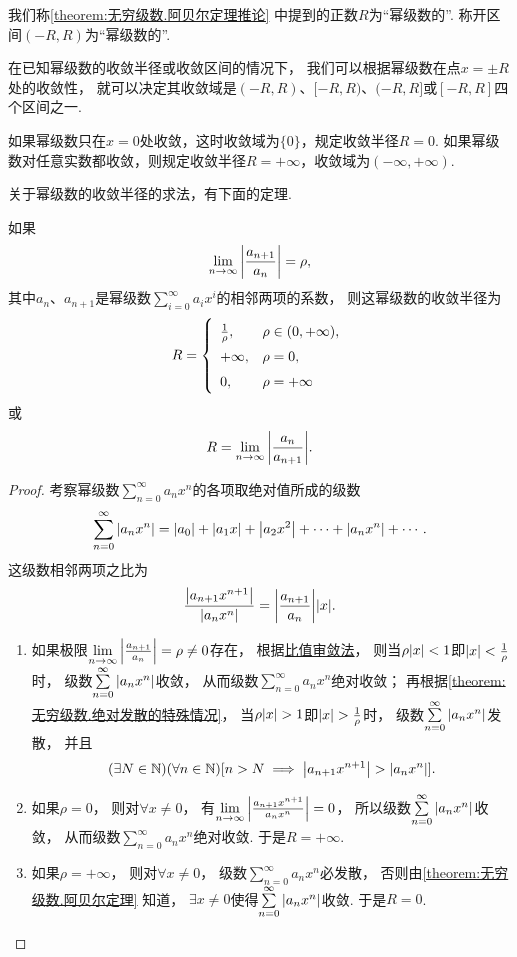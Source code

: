 我们称\cref{theorem:无穷级数.阿贝尔定理推论} 中提到的正数\(R\)为“幂级数的”.
称开区间\((-R,R)\)为“幂级数的”.

在已知幂级数的收敛半径或收敛区间的情况下，
我们可以根据幂级数在点\(x = \pm R\)处的收敛性，
就可以决定其收敛域是\((-R,R)\)、\([-R,R)\)、\((-R,R]\)或\([-R,R]\)四个区间之一.

如果幂级数只在\(x=0\)处收敛，这时收敛域为\(\{0\}\)，规定收敛半径\(R=0\).
如果幂级数对任意实数都收敛，则规定收敛半径\(R=+\infty\)，收敛域为\((-\infty,+\infty)\).

关于幂级数的收敛半径的求法，有下面的定理.
\begin{theorem}\label{theorem:无穷级数.幂级数的收敛半径的求法}
如果\[
\lim\limits_{n\to\infty} \abs{\frac{a_{n+1}}{a_n}} = \rho,
\]其中\(a_n\)、\(a_{n+1}\)是幂级数\(\sum\limits_{i=0}^\infty {a_i x^i}\)的相邻两项的系数，
则这幂级数的收敛半径为\[
\def\arraystretch{1.5}
R = \left\{ \begin{array}{ll}
\frac{1}{\rho}, & \rho \in (0,+\infty), \\
+\infty, & \rho = 0, \\
0, & \rho = +\infty \\
\end{array} \right.
\]或\[
R = \lim\limits_{n\to\infty} {\abs{\frac{a_n}{a_{n+1}}}}.
\]
\begin{proof}
\def\s{\sum\limits_{n=0}^\infty }%
考察幂级数\(\s a_n x^n\)的各项取绝对值所成的级数\[
\s \abs{a_n x^n}
= \abs{a_0} + \abs{a_1 x} + \abs{a_2 x^2} + \dotsb + \abs{a_n x^n} + \dotsb.
\]
这级数相邻两项之比为\[
\frac{\abs{a_{n+1} x^{n+1}}}{\abs{a_n x^n}}
= \abs{\frac{a_{n+1}}{a_n}} \abs{x}.
\]

\begin{enumerate}
	\item 如果极限\(\lim\limits_{n\to\infty} \abs{\frac{a_{n+1}}{a_n}} = \rho\neq0\)存在，
	根据\hyperref[theorem:无穷级数.正项级数的比值审敛法]{比值审敛法}，
	则当\(\rho \abs{x} < 1\)即\(\abs{x} < \frac{1}{\rho}\)时，
	级数\(\s \abs{a_n x^n}\)收敛，
	从而级数\(\s a_n x^n\)绝对收敛；
	再根据\cref{theorem:无穷级数.绝对发散的特殊情况}，
	当\(\rho \abs{x} > 1\)即\(\abs{x} > \frac{1}{\rho}\)时，
	级数\(\s \abs{a_n x^n}\)发散，
	并且\[
		(\exists N\in\mathbb{N})
		(\forall n\in\mathbb{N})
		[
			n > N
			\implies
			\abs{a_{n+1} x^{n+1}} > \abs{a_n x^n}
		].
	\]

	\item 如果\(\rho=0\)，
	则对\(\forall x\neq0\)，
	有\(\lim\limits_{n\to\infty} \abs{\frac{a_{n+1} x^{n+1}}{a_n x^n}} = 0\)，
	所以级数\(\s \abs{a_n x^n}\)收敛，
	从而级数\(\s a_n x^n\)绝对收敛.
	于是\(R=+\infty\).
		\item 如果\(\rho=+\infty\)，
	则对\(\forall x\neq0\)，
	级数\(\s a_n x^n\)必发散，
	否则由\cref{theorem:无穷级数.阿贝尔定理} 知道，
	\(\exists x\neq0\)使得\(\s \abs{a_n x^n}\)收敛.
	于是\(R=0\).
	\qedhere
\end{enumerate}
\end{proof}
\end{theorem}

